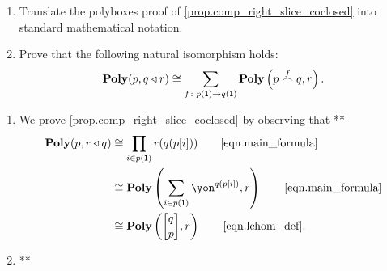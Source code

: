 \documentclass[Book-Poly]{subfiles}
\begin{document}
\begin{exercise} \label{exc.comp_right_slice_coclosed_calc}
\begin{enumerate}
    \item Translate the polyboxes proof of \cref{prop.comp_right_slice_coclosed} into standard mathematical notation.
    
    \item Prove that the following natural isomorphism holds:
    \begin{equation}
        \mathbf{Poly}(p,q\mathbin{\triangleleft} r)\cong\sum_{f\colon p(\textsf{1})\to q(\textsf{1})}\mathbf{Poly}\left(p\overset{f}{\frown}q,r\right).
    \end{equation}
\end{enumerate}
\begin{solution}
\begin{enumerate}
    \item We prove \cref{prop.comp_right_slice_coclosed} by observing that **
    \begin{align*}
        \poly(p,r\tri q)&\iso\prod_{i\in p(\1)}r(q(p[i])) \tag*{\eqref{eqn.main_formula}} \\
        &\iso\poly\left(\sum_{i\in p(\1)}\yon^{q(p[i])}, r\right) \tag*{\eqref{eqn.main_formula}} \\
        &\iso\poly\left(\lchom{q}{p}, r\right) \tag*{\eqref{eqn.lchom_def}}.
    \end{align*}
    
    \item **
\end{enumerate}
\end{solution}
\end{exercise}
\end{document}
